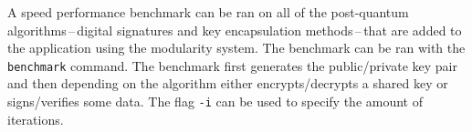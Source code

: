 A speed performance benchmark can be ran on all of the post-quantum algorithms\,--\,digital signatures and key encapsulation methods\,--\,that are added to the application using the modularity system. The benchmark can be ran with the \texttt{benchmark} command. The benchmark first generates the public/private key pair and then depending on the algorithm either encrypts/decrypts a shared key or signs/verifies some data. The flag \texttt{-i} can be used to specify the amount of iterations.
